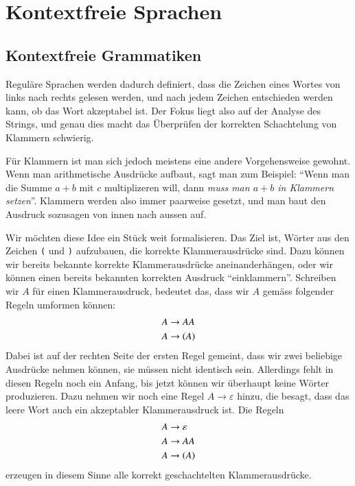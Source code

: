 %
%
%
\section{Kontextfreie Sprachen}
\subsection{Kontextfreie Grammatiken}
Reguläre Sprachen werden dadurch definiert, dass die Zeichen
eines Wortes von links nach rechts gelesen werden, und nach jedem
Zeichen entschieden werden kann, ob das Wort akzeptabel ist.
Der Fokus liegt also auf der Analyse des Strings, und genau dies
macht das Überprüfen der korrekten Schachtelung von Klammern
schwierig. 

%
Für Klammern ist man sich jedoch meistens eine andere Vorgehensweise
gewohnt. Wenn man arithmetische Ausdrücke aufbaut, sagt man zum
Beispiel: ``Wenn man die Summe $a+b$ mit $c$ multiplizeren will,
dann {\em muss man $a+b$ in Klammern setzen}''.
Klammern werden also immer paarweise gesetzt, und man baut den
Ausdruck sozusagen von innen nach aussen auf.

Wir möchten diese Idee ein Stück weit formalisieren. Das Ziel ist,
Wörter aus den Zeichen {\tt (} und {\tt )} aufzubauen, die korrekte
Klammerausdrücke sind. Dazu können wir bereits bekannte korrekte
Klammerausdrücke aneinanderhängen, oder wir können einen bereits
bekannten korrekten Ausdruck ``einklammern''. Schreiben wir $A$
für einen Klammerausdruck, bedeutet das, dass wir $A$ gemäss
folgender Regeln umformen können:
\begin{align*}
A&\to AA\\
A&\to {\tt (}A{\tt )}
\end{align*}
Dabei ist auf der rechten Seite der ersten Regel gemeint, dass wir zwei beliebige
Ausdrücke nehmen können, sie müssen nicht identisch sein. Allerdings
fehlt in diesen Regeln noch ein Anfang, bis jetzt können wir überhaupt
keine Wörter produzieren. Dazu nehmen wir noch eine Regel $A\to\varepsilon$
hinzu, die besagt, dass das leere Wort auch ein akzeptabler
Klammerausdruck ist. Die Regeln
\begin{align}
A&\to\varepsilon       \label{regeln-beispiel-1}\\
A&\to AA               \label{regeln-beispiel-2}\\
A&\to {\tt (}A{\tt )}  \label{regeln-beispiel-3}
\end{align}
erzeugen in diesem Sinne alle korrekt geschachtelten Klammerausdrücke.

